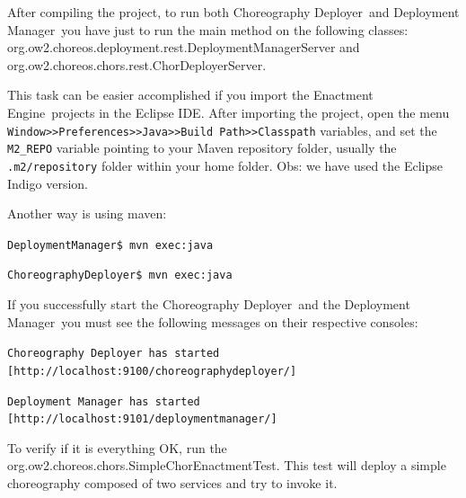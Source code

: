\documentclass[a4paper, 10pt]{article}
\newcommand{\ee}{Enactment Engine}
\newcommand{\cd}{Choreography Deployer}
\newcommand{\dm}{Deployment Manager}
\begin{document}
After compiling the project, to run both \cd\ and \dm\ you have just to run the main method on the following classes: \textsf{org.ow2.choreos.deployment.rest.DeploymentManagerServer} and \textsf{org.ow2.choreos.chors.rest.ChorDeployerServer}.

This task can be easier accomplished if you import the \ee\ projects in the Eclipse IDE. After importing the project, open the menu \texttt{Window>>Preferences>>Java>>Build Path>>Classpath} variables, and set the \texttt{M2\_REPO} variable pointing to your Maven repository folder, usually the \texttt{.m2/repository} folder within your home folder. Obs: we have used the Eclipse Indigo version.

Another way is using maven:

\texttt{DeploymentManager\$ mvn exec:java}

\texttt{ChoreographyDeployer\$ mvn exec:java}

If you successfully start the \cd\ and the \dm\, you must see the following messages on their respective consoles: 

\texttt{\cd\ has started [http://localhost:9100/choreographydeployer/]}

\texttt{\dm\ has started [http://localhost:9101/deploymentmanager/]}

To verify if it is everything OK, run the \textsf{org.ow2.choreos.chors.SimpleChorEnactmentTest}. This test will deploy a simple choreography composed of two services and try to invoke it.
\end{document}
